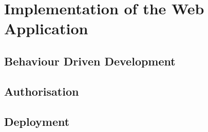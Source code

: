 \chapter{Implementation of the Web Application}

\section{Behaviour Driven Development}

\section{Authorisation}

\section{Deployment}
